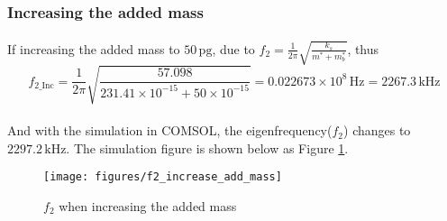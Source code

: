 \documentclass[a4paper,12pt,reqno]{report}
\begin{document}
        \subsubsection{Increasing the added mass}
        \paragraph{}
        If increasing the added mass to $50\,\unit{\pg}$, due to $f_2=\frac{1}{2\pi}\sqrt{\frac{k_s}{m^*+m_b^*}}$, thus
        $$f_{2\_\mathrm{Inc}}=\frac{1}{2\pi}\sqrt{\frac{57.098}{231.41\times10^{-15}+50\times10^{-15}}}=0.022673\times10^8\,\unit{\Hz}=2267.3\,\unit{\kHz}$$
        \paragraph{}
        And with the simulation in COMSOL, the eigenfrequency($f_2$) changes to $2297.2\,\unit{\kHz}$. The simulation figure is shown below as Figure \ref{Fig.f2_increase_add_mass}.
        \begin{figure}[H]
            \centering
            \texttt{[image: figures/f2\_increase\_add\_mass]}
            \caption{$f_2$ when increasing the added mass}
            \label{Fig.f2_increase_add_mass}
        \end{figure}
\end{document}
